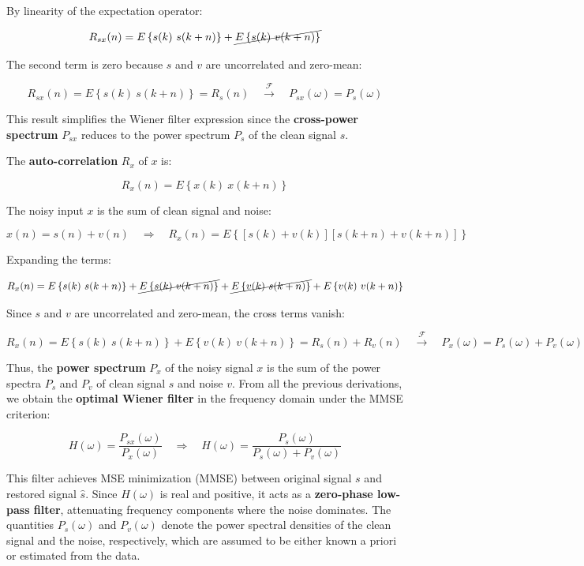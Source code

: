 By linearity of the expectation operator:

\[
R_{sx}(n) = E\left\{ s(k) \ s(k+n) \right\} + \cancel{E\left\{ s(k) \ v(k+n) \right\}}
\]

The second term is zero because $s$ and $v$ are uncorrelated and zero-mean:

\[
R_{sx}(n) = E\left\{ s(k) \ s(k+n) \right\} = R_s(n)
\quad \overset{\mathcal{F}}{\longrightarrow} \quad
P_{sx}(\omega) = P_s(\omega)
\]

This result simplifies the Wiener filter expression since the \textbf{cross-power spectrum} $P_{sx}$ reduces to the power spectrum $P_s$ of the clean signal $s$.

The \textbf{auto-correlation} $R_x$ of $x$ is:

\[
R_x(n) = E\left\{ x(k) \ x(k+n) \right\}
\]

The noisy input $x$ is the sum of clean signal and noise:

\[
x(n) = s(n) + v(n)
\quad \Rightarrow \quad
R_x(n) = E\left\{ \left[s(k) + v(k)\right] \left[s(k+n) + v(k+n)\right] \right\}
\]

Expanding the terms:

\[
R_x(n) = E\left\{ s(k) \ s(k+n) \right\} + \cancel{E\left\{ s(k) \ v(k+n) \right\}} + \cancel{E\left\{ v(k) \ s(k+n) \right\}} + E\left\{ v(k) \ v(k+n) \right\}
\]

Since $s$ and $v$ are uncorrelated and zero-mean, the cross terms vanish:

\[
R_x(n) = E\left\{ s(k) \ s(k+n) \right\} + E\left\{ v(k) \ v(k+n) \right\} = R_s(n) + R_v(n)
\quad \overset{\mathcal{F}}{\longrightarrow} \quad
P_x(\omega) = P_s(\omega) + P_v(\omega)
\]

Thus, the \textbf{power spectrum} $P_x$ of the noisy signal $x$ is the sum of the power spectra $P_s$ and $P_v$ of clean signal $s$ and noise $v$.
From all the previous derivations, we obtain the \textbf{optimal Wiener filter} in the frequency domain under the MMSE criterion:

\[
H(\omega) = \frac{P_{sx}(\omega)}{P_x(\omega)}
\quad \Rightarrow \quad
H(\omega) = \frac{P_s(\omega)}{P_s(\omega) + P_v(\omega)}
\]

This filter achieves MSE minimization (MMSE) between original signal $s$ and restored signal $\hat{s}$.  
Since $H(\omega)$ is real and positive, it acts as a \textbf{zero-phase low-pass filter}, attenuating frequency components where the noise dominates.
The quantities $P_s(\omega)$ and $P_v(\omega)$ denote the power spectral densities of the clean signal and the noise, respectively, which are assumed to be either known a priori or estimated from the data.

